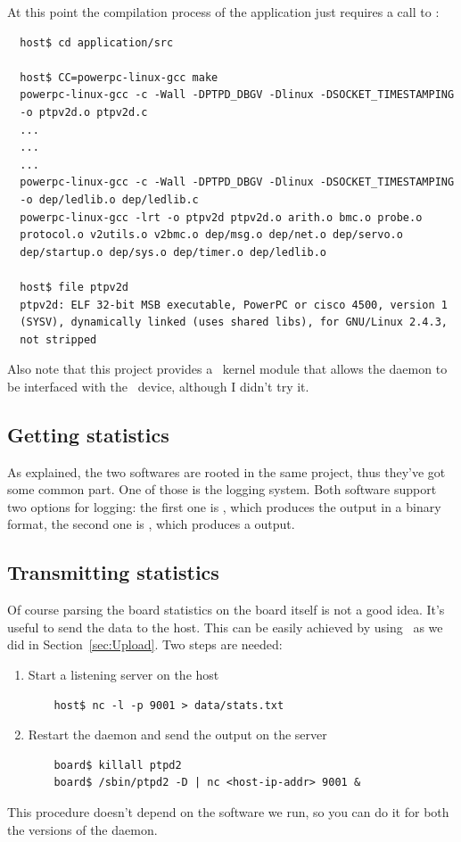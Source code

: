         At this point the compilation process of the application just
        requires a call to :
\begin{lstlisting}
  host$ cd application/src

  host$ CC=powerpc-linux-gcc make
  powerpc-linux-gcc -c -Wall -DPTPD_DBGV -Dlinux -DSOCKET_TIMESTAMPING
  -o ptpv2d.o ptpv2d.c
  ...
  ...
  ...
  powerpc-linux-gcc -c -Wall -DPTPD_DBGV -Dlinux -DSOCKET_TIMESTAMPING
  -o dep/ledlib.o dep/ledlib.c
  powerpc-linux-gcc -lrt -o ptpv2d ptpv2d.o arith.o bmc.o probe.o
  protocol.o v2utils.o v2bmc.o dep/msg.o dep/net.o dep/servo.o
  dep/startup.o dep/sys.o dep/timer.o dep/ledlib.o

  host$ file ptpv2d
  ptpv2d: ELF 32-bit MSB executable, PowerPC or cisco 4500, version 1
  (SYSV), dynamically linked (uses shared libs), for GNU/Linux 2.4.3,
  not stripped
\end{lstlisting}

        Also note that this project provides a \Linux\ kernel module that
        allows the daemon to be interfaced with the \Vitesse\ device,
        although I didn't try it.

\subsection{ Getting statistics } \label{sub:Stats}

    As explained, the two softwares are rooted in the same project, thus
    they've got some common part. One of those is the logging system. Both
    software support two options for logging: the first one is ,
    which produces the output in a binary format, the second one is
    , which produces a  output.

    \subsection{ Transmitting statistics }

        Of course parsing the board statistics on the board itself is not
        a good idea. It's useful to send the data to the host. This can be
        easily achieved by using \NetCat\ as we did in
        Section~\ref{sec:Upload}. Two steps are needed:
        \begin{enumerate}
        \item   Start a listening server on the host
\begin{lstlisting}
    host$ nc -l -p 9001 > data/stats.txt
\end{lstlisting}
        \item   Restart the daemon and send the output on the server
\begin{lstlisting}
    board$ killall ptpd2
    board$ /sbin/ptpd2 -D | nc <host-ip-addr> 9001 &
\end{lstlisting}
        \end{enumerate}
        This procedure doesn't depend on the software we run, so
        you can do it for both the versions of the daemon.

